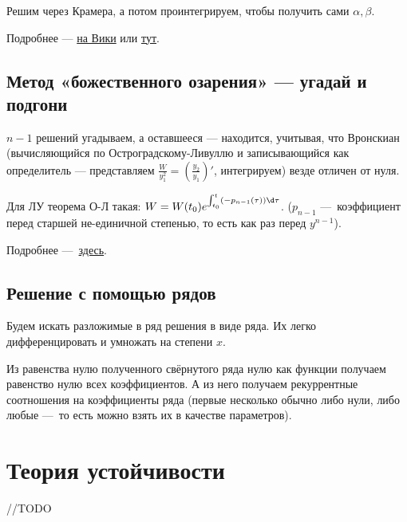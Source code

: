 \documentclass[12pt, a4paper]{article}
\begin{document}
Решим через Крамера, а потом проинтегрируем, чтобы получить сами $\alpha, \beta$.

Подробнее — \href{https://en.wikipedia.org/wiki/Variation_of_parameters}{на Вики} 
или \href{https://tutorial.math.lamar.edu/classes/de/VariationofParameters.aspx}{тут}.

\subsection{Метод «божественного озарения» — угадай и подгони}

$n - 1$ решений угадываем, а оставшееся — находится, учитывая, 
что Вронскиан (вычисляющийся по Остроградскому-Ливуллю 
и записывающийся как определитель — 
представляем $\frac{W}{y_1^2} = \left(\frac{y_2}{y_1}\right)'$, интегрируем)
везде отличен от нуля.

Для ЛУ теорема О-Л такая: $W = W(t_0) e^{\int_{t_0}^t (-p_{n-1}(\tau)) \d \tau}$. ($p_{n - 1}$ — коэффициент перед старшей не-единичной степенью, то есть как раз перед $y^{n - 1}$).

Подробнее — \href{https://ru.wikipedia.org/wiki/%D0%A4%D0%BE%D1%80%D0%BC%D1%83%D0%BB%D0%B0_%D0%9B%D0%B8%D1%83%D0%B2%D0%B8%D0%BB%D0%BB%D1%8F_%E2%80%94_%D0%9E%D1%81%D1%82%D1%80%D0%BE%D0%B3%D1%80%D0%B0%D0%B4%D1%81%D0%BA%D0%BE%D0%B3%D0%BE}{здесь}.


\subsection{Решение с помощью рядов}

Будем искать разложимые в ряд решения в виде ряда.
Их легко дифференцировать и умножать на степени $x$.

Из равенства нулю полученного свёрнутого ряда нулю как функции 
получаем равенство нулю всех коэффициентов. 
А из него получаем рекуррентные соотношения на коэффициенты ряда 
(первые несколько обычно либо нули, 
либо любые — то есть можно взять их в качестве параметров).

\section{Теория устойчивости}

//TODO
\end{document}
